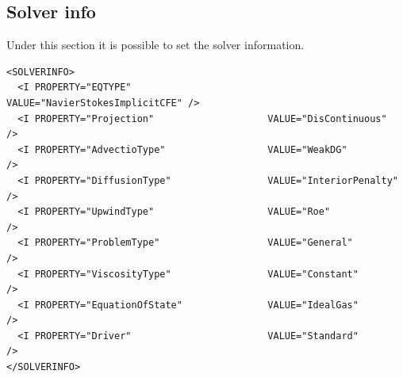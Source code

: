 \subsection*{Solver info}
Under this section it is possible to set the solver information.
\begin{lstlisting}[style=XmlStyle]
<SOLVERINFO>
  <I PROPERTY="EQTYPE"                        VALUE="NavierStokesImplicitCFE" />
  <I PROPERTY="Projection"                    VALUE="DisContinuous"           />
  <I PROPERTY="AdvectioType"                  VALUE="WeakDG"                  />
  <I PROPERTY="DiffusionType"                 VALUE="InteriorPenalty"         />
  <I PROPERTY="UpwindType"                    VALUE="Roe"                     />
  <I PROPERTY="ProblemType"                   VALUE="General"                 />
  <I PROPERTY="ViscosityType"                 VALUE="Constant"                />
  <I PROPERTY="EquationOfState"               VALUE="IdealGas"                />
  <I PROPERTY="Driver"                        VALUE="Standard"                />
</SOLVERINFO>
\end{lstlisting}
